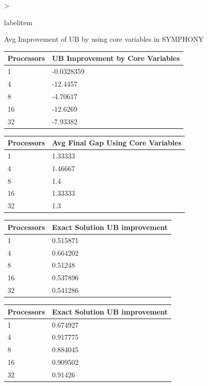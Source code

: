 \documentclass[headrule,landscape]{foils}
\makeatletter
\def\blu#1{\textcolor{blue}{#1}}
\newcommand{\foil}[1]{\foilhead[-.6in]{\blu{#1}}}
\newcommand{\bi}{\begin{itemize}}
\newcommand{\ei}{\end{itemize}}
\newcommand{\bb}{\item}
\renewenvironment{itemize}[1][0pt]{%
  \ifnum \@itemdepth >\thr@@\@toodeep\else
    \advance\@itemdepth\@ne
    \edef\@itemitem{labelitem\romannumeral\the\@itemdepth}%
    \expandafter
    \list
      \csname\@itemitem\endcsname
      {\def\makelabel##1{\hss\llap{##1}}}\itemsep=#1%
  \fi
}{\endlist}
\makeatother
\begin{document}
{%
\foil{Computational Results: Effect of Core Variables on UB}
\bi
\bb Avg Improvement of UB by using core variables in SYMPHONY
\ei
\begin{center}
\begin{tabular}{||l|l||}
\hline
Processors & UB Improvement by Core Variables \\\hline\hline
1 & -0.0328359\\\hline
4 & -12.4457\\\hline
8 & -4.70617\\\hline
16 & -12.6269\\\hline
32 & -7.93382\\\hline
\hline
\end{tabular}
\end{center}

\foil{Computational Results: Effect of Processors on Gap (E on)}
\begin{center}
\begin{tabular}{||l|l||}
\hline
Processors & Avg Final Gap Using Core Variables\\\hline\hline
1 & 1.33333\\\hline
4 & 1.46667\\\hline
8 & 1.4\\\hline
16 & 1.33333\\\hline
32 & 1.3\\\hline
\hline
\end{tabular}
\end{center}

\foil{Computational Results: Exact Solution UB improvement(E on)}
\begin{center}
\begin{tabular}{||l|l||}
\hline
Processors & Exact Solution UB improvement\\\hline\hline
1 & 0.515871\\\hline
4 & 0.664202\\\hline
8 & 0.51248\\\hline
16 & 0.537896\\\hline
32 & 0.541286\\\hline
\hline
\end{tabular}
\end{center}

\foil{Computational Results: Exact Solution UB improvement(E off)}
\begin{center}
\begin{tabular}{||l|l||}
\hline
Processors & Exact Solution UB improvement\\\hline\hline
1 & 0.674927\\\hline
4 & 0.917775\\\hline
8 & 0.884045\\\hline
16 & 0.909502\\\hline
32 & 0.91426\\\hline
\hline
\end{tabular}
\end{center}
}
\end{document}
